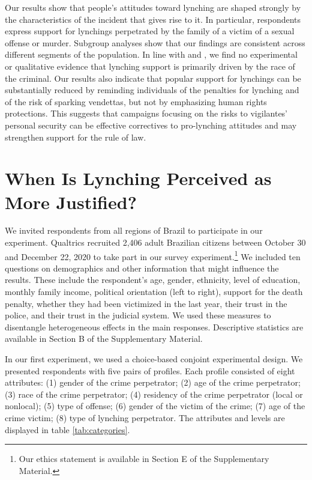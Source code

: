 \documentclass[12pt,a4paper]{article}
\begin{document}
Our results show that people's attitudes toward lynching are shaped strongly by
the characteristics of the incident that gives rise to it. In particular,
respondents express support for lynchings perpetrated by the family of a victim
of a sexual offense or murder. Subgroup analyses show that our findings are
consistent across different segments of the population. In line with
\citet{godoy2006popular} and \citet{martins2015linchamentos}, we find no
experimental or qualitative evidence that lynching support is primarily driven
by the race of the criminal. Our results also indicate that popular support for
lynchings can be substantially reduced by reminding individuals of the
penalties for lynching and of the risk of sparking vendettas, but not by
emphasizing human rights protections. This suggests that campaigns focusing on
the risks to vigilantes' personal security can be effective correctives to
pro-lynching attitudes and may strengthen support for the rule of law. 


\section{When Is Lynching Perceived as More Justified?}
\label{sec:exp01}

We invited respondents from all regions of Brazil to participate in our
experiment. Qualtrics recruited 2,406 adult Brazilian citizens between October
30 and December 22, 2020 to take part in our survey experiment.\footnote{Our
ethics statement is available in Section E of the Supplementary Material.} We
included ten questions on demographics and other information that might
influence the results. These include the respondent's age, gender, ethnicity,
level of education, monthly family income, political orientation (left to
right), support for the death penalty, whether they had been victimized in the
last year, their trust in the police, and their trust in the judicial system.
We used these measures to disentangle heterogeneous effects in the main
responses. Descriptive statistics are available in Section B of the
Supplementary Material.

In our first experiment, we used a choice-based conjoint experimental design.
We presented respondents with five pairs of profiles. Each profile consisted of
eight attributes: (1) gender of the crime perpetrator; (2) age of the crime
perpetrator; (3) race of the crime perpetrator; (4) residency of the crime
perpetrator (local or nonlocal); (5) type of offense; (6) gender of the victim
of the crime; (7) age of the crime victim; (8) type of lynching perpetrator.
The attributes and levels are displayed in table \ref{tab:categories}.
\end{document}
